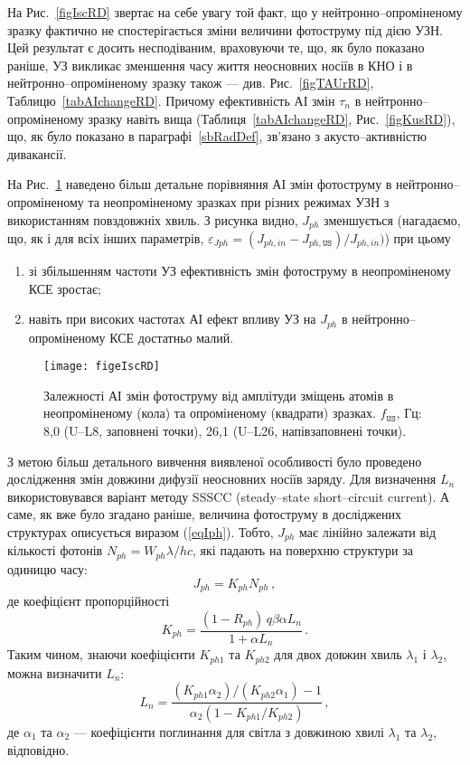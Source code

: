 На Рис.~\ref{figIscRD} звертає на себе увагу той факт, що у нейтронно--опроміненому
зразку фактично не спостерігається зміни величини фотоструму під дією УЗН.
Цей результат є досить несподіваним, враховуючи те, що, як було показано раніше,
УЗ викликає зменшення часу життя неосновних носіїв в КНО і в нейтронно--опроміненому зразку також ---
див. Рис.~\ref{figTAUrRD}, Таблицю~\ref{tabAIchangeRD}.
Причому ефективність АІ змін $\tau_n$ в нейтронно--опроміненому зразку навіть вища (Таблиця~\ref{tabAIchangeRD}, Рис.~\ref{figKusRD}),
що, як було показано в параграфі~\ref{sbRadDef}, зв'язано з акусто--активністю дивакансії.

На Рис.~\ref{figeIscRD} наведено більш детальне порівняння АІ змін фотоструму в нейтронно--опроміненому та неопроміненому
зразках при різних режимах УЗН з використанням повздовжніх хвиль.
З рисунка видно, $J_{ph}$ зменшується (нагадаємо, що, як і для всіх інших параметрів, $\varepsilon_{Jph}=(J_{ph,in}-J_{ph,\mathtt{US}})/{J_{ph,in}})$) при цьому
\begin{enumerate}[label=\asbuk*),leftmargin=0em,itemindent=1.5em]
\item зі збільшенням частоти УЗ ефективність змін фотоструму в неопроміненому КСЕ зростає;
\item навіть при високих частотах АІ ефект впливу УЗ на $J_{ph}$ в нейтронно--опроміненому КСЕ достатньо малий.
\end{enumerate}


\begin{figure}
\center
\texttt{[image: figeIscRD]}
\caption{\label{figeIscRD}
Залежності АІ змін фотоструму від
амплітуди зміщень атомів в неопроміненому (кола)
та опроміненому (квадрати) зразках.
$f_\mathtt{US}$, Гц: 8,0 (U--L8, заповнені точки),
26,1 (U--L26, напівзаповнені точки).
}%
\end{figure}

З метою більш детального вивчення виявленої особливості було проведено дослідження змін
довжини дифузії неосновних носіїв заряду.
Для визначення $L_n$ використовувався варіант методу SSSCC (steady--state short--circuit current)\cite{Schroder2006}.
А саме, як вже було згадано раніше, величина фотоструму в досліджених структурах
описується виразом (\ref{eqIph}).
Тобто, $J_{ph}$ має лінійно залежати від кількості фотонів
\mbox{$N_{ph}=W_{ph}\lambda /hc$}, які падають на поверхню структури за одиницю часу:
\begin{equation}
J_{ph}=K_{ph}N_{ph}\,,
\end{equation}
де коефіцієнт пропорційності
\begin{equation}
 K_{ph}=\frac{(1-R_{ph})\,q\beta \alpha L_n} {1+\alpha L_n}\,.
\end{equation}
Таким чином, знаючи коефіцієнти $K_{ph1}$ та $K_{ph2}$
для двох довжин хвиль $\lambda_1$ і $\lambda_2$, можна
визначити $L_n$:
\begin{equation}\label{F3}
L_n=\frac{(K_{ph1}\alpha_2)/(K_{ph2}\alpha_1)-1}{\alpha_2(1-K_{ph1}/K_{ph2})}\,,
\end{equation}
де $\alpha_1$ та $\alpha_2$ --- коефіцієнти поглинання для
світла з довжиною хвилі $\lambda_1$ та $\lambda_2$, відповідно.


